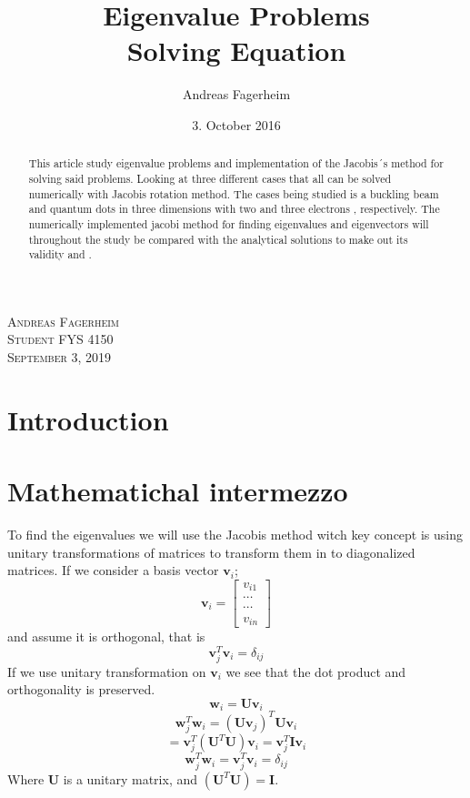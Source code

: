 \documentclass{article}
\title{Eigenvalue Problems \\
		Solving \SL Equation
		}
\author{Andreas Fagerheim}
\date{3. October 2016}
\begin{document}
\maketitle
	

\begin{abstract}
This article study eigenvalue problems and implementation of the Jacobis´s method for solving said problems. Looking at three different cases that all can be solved numerically with Jacobis rotation method. The cases being studied is a buckling beam and quantum dots in three dimensions with two and three electrons , respectively. The numerically implemented jacobi method for finding eigenvalues and eigenvectors will throughout the study be compared with the analytical solutions to make out its validity and .
\end{abstract}
\begin{flushright}
	\textsc{Andreas Fagerheim \\
	Student FYS 4150\\
	September 3, 2019}
	\end{flushright}

\cleardoublepage
\section{Introduction}




\section{Mathematichal intermezzo}\label{sec:math}
To find the eigenvalues we will use the Jacobis method witch key concept is using unitary transformations of matrices to transform them in to diagonalized matrices. %
If we consider a basis vector $\mathbf{v}_i$;
$$\mathbf{v}_i = \begin{bmatrix}
					v_{i1} \\
					\cdots\\
					\cdots\\
					v_{in}
\end{bmatrix}
$$
and  assume it is orthogonal, that is
$$\mathbf{v}_j^T \mathbf{v}_i = \delta_{ij}$$
If we use unitary transformation on $\mathbf{v}_i$ we see that the dot product and orthogonality is preserved. 
$$
\mathbf{w}_i = \mathbf{U}\mathbf{v}_i
$$
$$
\mathbf{w}_j^T\mathbf{w}_i = (\mathbf{U}\mathbf{v}_j)^T \mathbf{U}\mathbf{v}_i
$$$$
= \mathbf{v}_j^T(\mathbf{U}^T \mathbf{U})\mathbf{v}_i = \mathbf{v}_j^T\mathbf{I}\mathbf{v}_i 
$$
$$
\mathbf{w}_j^T\mathbf{w}_i = \mathbf{v}_j^T\mathbf{v}_i = \delta_{ij}
$$
Where $\mathbf{U}$ is a unitary matrix, and $(\mathbf{U}^T \mathbf{U}) =\mathbf{I} $.
\end{document}
